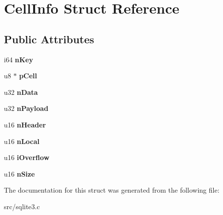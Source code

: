 \hypertarget{struct_cell_info}{\section{Cell\-Info Struct Reference}
\label{struct_cell_info}
}
\subsection*{Public Attributes}
\begin{DoxyCompactItemize}
\item 
\hypertarget{struct_cell_info_a542b041b9a54a13f7c6f2fe63e7542c0}{i64 {\bfseries n\-Key}}\label{struct_cell_info_a542b041b9a54a13f7c6f2fe63e7542c0}

\item 
\hypertarget{struct_cell_info_a595ed7eeb60ea274d868f24347b7238e}{u8 $\ast$ {\bfseries p\-Cell}}\label{struct_cell_info_a595ed7eeb60ea274d868f24347b7238e}

\item 
\hypertarget{struct_cell_info_af2301ed16c35633ec6b5d7792734a4bf}{u32 {\bfseries n\-Data}}\label{struct_cell_info_af2301ed16c35633ec6b5d7792734a4bf}

\item 
\hypertarget{struct_cell_info_ac1e3c1b4216a8e778bbac82907bb1485}{u32 {\bfseries n\-Payload}}\label{struct_cell_info_ac1e3c1b4216a8e778bbac82907bb1485}

\item 
\hypertarget{struct_cell_info_a99bb1f87208f793359cf63e3d164025b}{u16 {\bfseries n\-Header}}\label{struct_cell_info_a99bb1f87208f793359cf63e3d164025b}

\item 
\hypertarget{struct_cell_info_a8cedbcc2c94916fe5798b502c614bb08}{u16 {\bfseries n\-Local}}\label{struct_cell_info_a8cedbcc2c94916fe5798b502c614bb08}

\item 
\hypertarget{struct_cell_info_af7be0161f1c67600aeba783a68972f70}{u16 {\bfseries i\-Overflow}}\label{struct_cell_info_af7be0161f1c67600aeba783a68972f70}

\item 
\hypertarget{struct_cell_info_ace78ab5eb5337b686e31b895feeb0562}{u16 {\bfseries n\-Size}}\label{struct_cell_info_ace78ab5eb5337b686e31b895feeb0562}

\end{DoxyCompactItemize}


The documentation for this struct was generated from the following file\-:\begin{DoxyCompactItemize}
\item 
src/sqlite3.\-c\end{DoxyCompactItemize}
